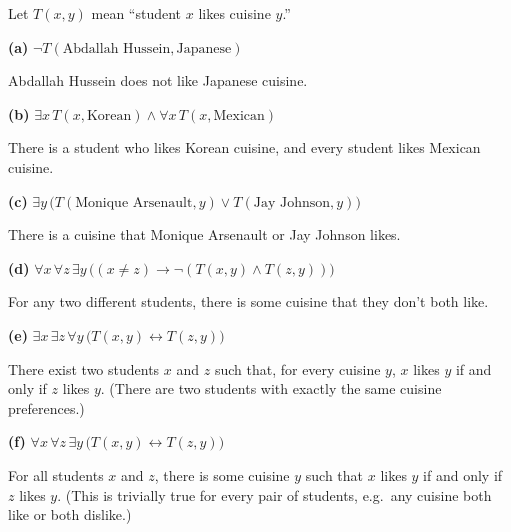 \documentclass[11pt]{article}
\begin{document}
\begin{solution}
Let $T(x,y)$ mean ``student $x$ likes cuisine $y$.''

\medskip
\noindent\textbf{(a)} $\neg T(\text{Abdallah Hussein}, \text{Japanese})$

Abdallah Hussein does not like Japanese cuisine.

\medskip
\noindent\textbf{(b)} $\exists x\,T(x,\text{Korean})\wedge \forall x\,T(x,\text{Mexican})$

There is a student who likes Korean cuisine, and every student likes
Mexican cuisine.

\medskip
\noindent\textbf{(c)} $\exists y\,\big(T(\text{Monique Arsenault}, y)\vee T(\text{Jay Johnson}, y)\big)$

There is a cuisine that Monique Arsenault or Jay Johnson likes.

\medskip
\noindent\textbf{(d)} $\forall x\,\forall z\,\exists y\,\big((x\neq z)\to \neg(T(x,y)\wedge T(z,y))\big)$

For any two different students, there is some cuisine that they
don't both like.

\medskip
\noindent\textbf{(e)} $\exists x\,\exists z\,\forall y\,\big(T(x,y)\leftrightarrow T(z,y)\big)$

There exist two students $x$ and $z$ such that, for every cuisine
$y$, $x$ likes $y$ if and only if $z$ likes $y$. (There are two
students with exactly the same cuisine preferences.)

\medskip
\noindent\textbf{(f)} $\forall x\,\forall z\,\exists y\,\big(T(x,y)\leftrightarrow T(z,y)\big)$

For all students $x$ and $z$, there is some cuisine $y$ such that
$x$ likes $y$ if and only if $z$ likes $y$. (This is trivially true
for every pair of students, e.g.\ any cuisine both like or both
dislike.)
\end{solution}
\end{document}
